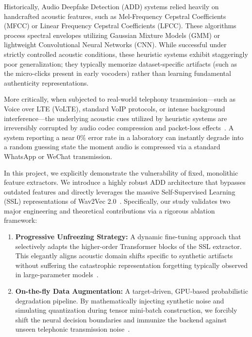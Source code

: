 \documentclass[10pt, twocolumn]{article}
\begin{document}
Historically, Audio Deepfake Detection (ADD) systems relied heavily on handcrafted acoustic features, such as Mel-Frequency Cepstral Coefficients (MFCC) or Linear Frequency Cepstral Coefficients (LFCC). These algorithms process spectral envelopes utilizing Gaussian Mixture Models (GMM) or lightweight Convolutional Neural Networks (CNN). While successful under strictly controlled acoustic conditions, these heuristic systems exhibit staggeringly poor generalization; they typically memorize dataset-specific artifacts (such as the micro-clicks present in early vocoders) rather than learning fundamental authenticity representations. 

More critically, when subjected to real-world telephony transmission—such as Voice over LTE (VoLTE), standard VoIP protocols, or intense background interference—the underlying acoustic cues utilized by heuristic systems are irreversibly corrupted by audio codec compression and packet-loss effects~\cite{addc_benchmark}. A system reporting a near 0\% error rate in a laboratory can instantly degrade into a random guessing state the moment audio is compressed via a standard WhatsApp or WeChat transmission.

In this project, we explicitly demonstrate the vulnerability of fixed, monolithic feature extractors. We introduce a highly robust ADD architecture that bypasses outdated features and directly leverages the massive Self-Supervised Learning (SSL) representations of Wav2Vec 2.0~\cite{wav2vec2}. Specifically, our study validates two major engineering and theoretical contributions via a rigorous ablation framework:
\begin{enumerate}
    \item \textbf{Progressive Unfreezing Strategy:} A dynamic fine-tuning approach that selectively adapts the higher-order Transformer blocks of the SSL extractor. This elegantly aligns acoustic domain shifts specific to synthetic artifacts without suffering the catastrophic representation forgetting typically observed in large-parameter models~\cite{ssl_layerwise}.
    \item \textbf{On-the-fly Data Augmentation:} A target-driven, GPU-based probabilistic degradation pipeline. By mathematically injecting synthetic noise and simulating quantization during tensor mini-batch construction, we forcibly shift the neural decision boundaries and immunize the backend against unseen telephonic transmission noise~\cite{targeted_aug}.
\end{enumerate}
\end{document}
